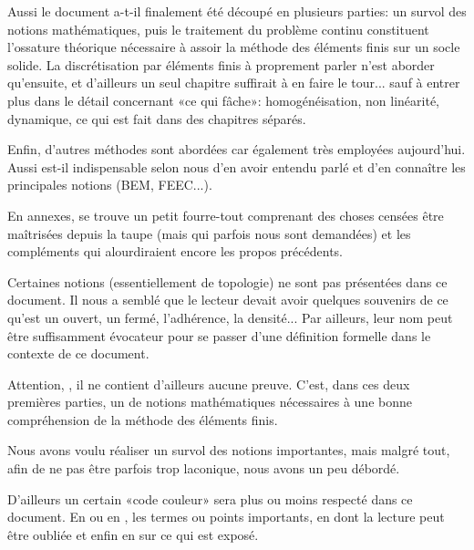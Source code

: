 \documentclass[11pt,pdflatex]{book}
\begin{document}
Aussi le document a-t-il finalement été découpé en plusieurs parties:
un survol des notions mathématiques, puis le traitement du problème
continu constituent l'ossature théorique nécessaire à assoir la méthode des éléments finis
sur un socle solide. La discrétisation par éléments finis à proprement parler
n'est aborder qu'ensuite, et d'ailleurs un seul chapitre suffirait à en faire
le tour... sauf à entrer plus dans le détail concernant «ce qui fâche»:
homogénéisation, non linéarité, dynamique, ce qui est fait dans des
chapitres séparés.

\medskip
Enfin, d'autres méthodes sont abordées car également très
employées aujourd'hui. Aussi est-il indispensable selon nous d'en avoir 
entendu parlé et d'en connaître les principales notions (BEM, FEEC...).

\medskip
En annexes, se trouve un petit fourre-tout comprenant des choses censées être 
maîtrisées depuis la taupe (mais qui parfois nous sont demandées) et les
compléments qui alourdiraient encore les propos précédents.

\medskip
Certaines notions (essentiellement de topologie) ne sont pas présentées dans ce 
document.
Il nous a semblé que le lecteur devait avoir quelques souvenirs de ce qu'est un
ouvert, un fermé, l'adhérence, la densité...
Par ailleurs, leur nom peut être suffisamment évocateur pour se passer d'une
définition formelle dans le contexte de ce document.

\bigskip
Attention, , il ne contient
d'ailleurs aucune preuve.
C'est, dans ces deux premières parties, un  de 
notions mathématiques nécessaires à une bonne compréhension de la méthode des éléments finis.

Nous avons voulu réaliser un survol des notions importantes, mais malgré tout, afin de ne
pas être parfois trop laconique, nous avons un peu débordé. \ifVersionDuDocEstVincent{}\fi

\medskip
\ifVersionDuDocEstVincent
D'ailleurs un certain «code couleur» sera plus ou moins respecté dans ce document.
En  ou en , les termes ou points importants,
en  dont la lecture peut être
oubliée et enfin en
 sur ce qui est exposé.
\fi
\end{document}
